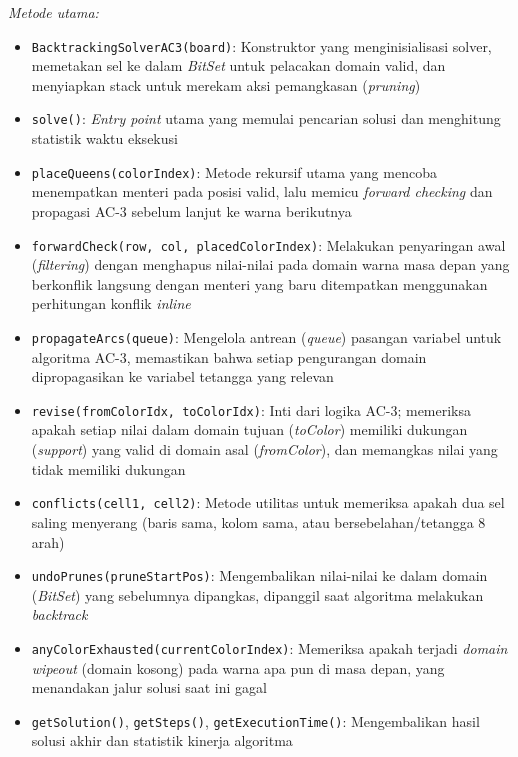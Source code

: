 \documentclass[a4paper,twoside]{article}
\begin{document}
\begin{itemize}
		\textit{Metode utama:}
		\begin{itemize}
			\item \texttt{BacktrackingSolverAC3(board)}: Konstruktor yang menginisialisasi solver, memetakan sel ke dalam \textit{BitSet} untuk pelacakan domain valid, dan menyiapkan stack untuk merekam aksi pemangkasan (\textit{pruning})
			\item \texttt{solve()}: \textit{Entry point} utama yang memulai pencarian solusi dan menghitung statistik waktu eksekusi
			\item \texttt{placeQueens(colorIndex)}: Metode rekursif utama yang mencoba menempatkan menteri pada posisi valid, lalu memicu \textit{forward checking} dan propagasi AC-3 sebelum lanjut ke warna berikutnya
			\item \texttt{forwardCheck(row, col, placedColorIndex)}: Melakukan penyaringan awal (\textit{filtering}) dengan menghapus nilai-nilai pada domain warna masa depan yang berkonflik langsung dengan menteri yang baru ditempatkan menggunakan perhitungan konflik \textit{inline}
			\item \texttt{propagateArcs(queue)}: Mengelola antrean (\textit{queue}) pasangan variabel untuk algoritma AC-3, memastikan bahwa setiap pengurangan domain dipropagasikan ke variabel tetangga yang relevan
			\item \texttt{revise(fromColorIdx, toColorIdx)}: Inti dari logika AC-3; memeriksa apakah setiap nilai dalam domain tujuan (\textit{toColor}) memiliki dukungan (\textit{support}) yang valid di domain asal (\textit{fromColor}), dan memangkas nilai yang tidak memiliki dukungan
			\item \texttt{conflicts(cell1, cell2)}: Metode utilitas untuk memeriksa apakah dua sel saling menyerang (baris sama, kolom sama, atau bersebelahan/tetangga 8 arah)
			\item \texttt{undoPrunes(pruneStartPos)}: Mengembalikan nilai-nilai ke dalam domain (\textit{BitSet}) yang sebelumnya dipangkas, dipanggil saat algoritma melakukan \textit{backtrack}
			\item \texttt{anyColorExhausted(currentColorIndex)}: Memeriksa apakah terjadi \textit{domain wipeout} (domain kosong) pada warna apa pun di masa depan, yang menandakan jalur solusi saat ini gagal
			\item \texttt{getSolution()}, \texttt{getSteps()}, \texttt{getExecutionTime()}: Mengembalikan hasil solusi akhir dan statistik kinerja algoritma
		\end{itemize}
		

\end{itemize}
\end{document}
